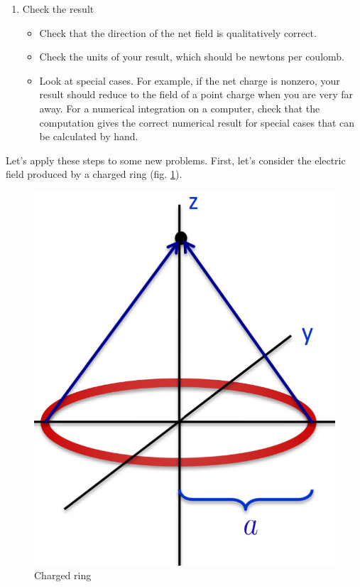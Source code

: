 \documentclass[nobib]{tufte-handout}
\begin{document}
\begin{enumerate}
\begin{itemize}
    \end{itemize}
    \item Check the result
    \begin{itemize}
        \item Check that the direction of the net field is qualitatively correct.
        \item Check the units of your result, which should be newtons per coulomb.
        \item Look at special cases. For example, if the net charge is 
        nonzero, your result should reduce to the field of a point 
        charge when you are very far away. For a numerical integration 
        on a computer, check that the computation gives the correct numerical 
        result for special cases that can be calculated by hand.
    \end{itemize}
\end{enumerate}
Let's apply these steps to some new problems. First, let's consider the electric field
produced by a charged ring (fig. \ref{fig:ring}).
\begin{figure}
    \center
    \caption{Charged ring}
    \label{fig:ring}
    \includegraphics[width=\textwidth/2]{images/ring.png}
\end{figure}
\end{document}
